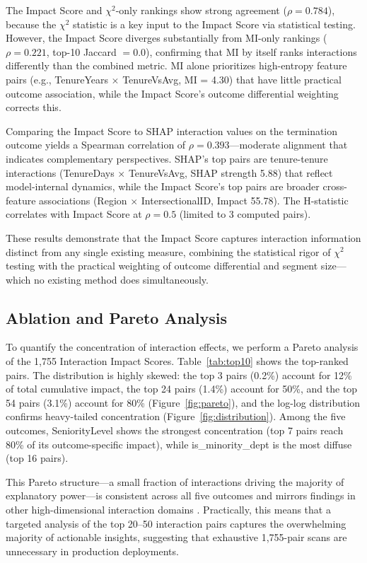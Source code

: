 \documentclass[conference]{IEEEtran}
\begin{document}
The Impact Score and $\chi^2$-only rankings show strong agreement ($\rho = 0.784$), because the $\chi^2$ statistic is a key input to the Impact Score via statistical testing. However, the Impact Score diverges substantially from MI-only rankings ($\rho = 0.221$, top-10 Jaccard $= 0.0$), confirming that MI by itself ranks interactions differently than the combined metric. MI alone prioritizes high-entropy feature pairs (e.g., TenureYears $\times$ TenureVsAvg, MI = 4.30) that have little practical outcome association, while the Impact Score's outcome differential weighting corrects this.

Comparing the Impact Score to SHAP interaction values on the termination outcome yields a Spearman correlation of $\rho = 0.393$---moderate alignment that indicates complementary perspectives. SHAP's top pairs are tenure-tenure interactions (TenureDays $\times$ TenureVsAvg, SHAP strength 5.88) that reflect model-internal dynamics, while the Impact Score's top pairs are broader cross-feature associations (Region $\times$ IntersectionalID, Impact 55.78). The H-statistic correlates with Impact Score at $\rho = 0.5$ (limited to 3 computed pairs).

These results demonstrate that the Impact Score captures interaction information distinct from any single existing measure, combining the statistical rigor of $\chi^2$ testing with the practical weighting of outcome differential and segment size---which no existing method does simultaneously.

\subsection{Ablation and Pareto Analysis}

To quantify the concentration of interaction effects, we perform a Pareto analysis of the 1,755 Interaction Impact Scores. Table~\ref{tab:top10} shows the top-ranked pairs. The distribution is highly skewed: the top 3 pairs (0.2\%) account for 12\% of total cumulative impact, the top 24 pairs (1.4\%) account for 50\%, and the top 54 pairs (3.1\%) account for 80\% (Figure~\ref{fig:pareto}), and the log-log distribution confirms heavy-tailed concentration (Figure~\ref{fig:distribution}). Among the five outcomes, SeniorityLevel shows the strongest concentration (top 7 pairs reach 80\% of its outcome-specific impact), while is\_minority\_dept is the most diffuse (top 16 pairs).

This Pareto structure---a small fraction of interactions driving the majority of explanatory power---is consistent across all five outcomes and mirrors findings in other high-dimensional interaction domains \cite{sorokina2008detecting}. Practically, this means that a targeted analysis of the top 20--50 interaction pairs captures the overwhelming majority of actionable insights, suggesting that exhaustive 1,755-pair scans are unnecessary in production deployments.
\end{document}
